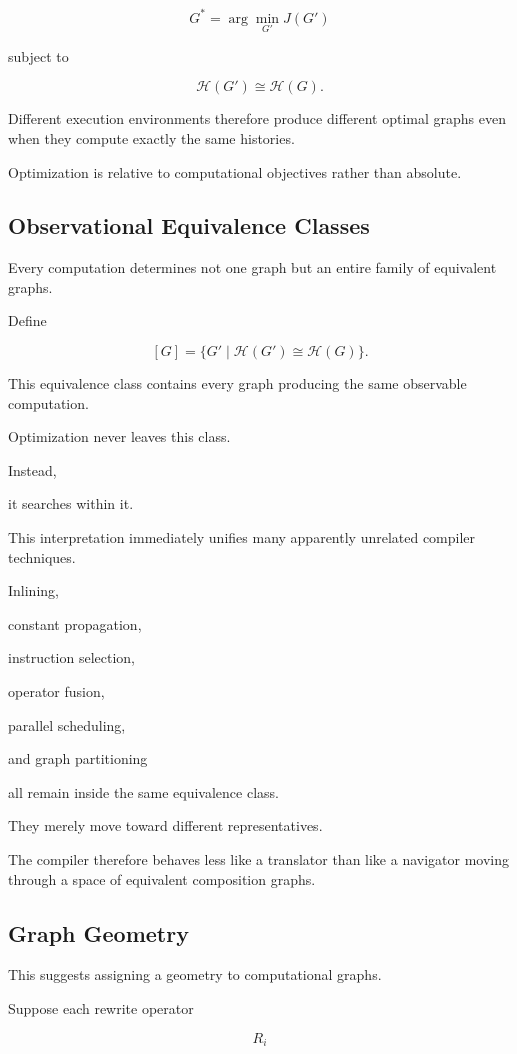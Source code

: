 \documentclass[12pt,oneside]{article}
\begin{document}
\[
G^*
=
\arg\min_{G'}
J(G')
\]

subject to

\[
\mathcal H(G')
\cong
\mathcal H(G).
\]

Different execution environments therefore produce different optimal graphs even when they compute exactly the same histories.

Optimization is relative to computational objectives rather than absolute.

\subsection{Observational Equivalence Classes}

Every computation determines not one graph but an entire family of equivalent graphs.

Define

\[
[G]
=
\{
G'
\mid
\mathcal H(G')
\cong
\mathcal H(G)
\}.
\]

This equivalence class contains every graph producing the same observable computation.

Optimization never leaves this class.

Instead,

it searches within it.

This interpretation immediately unifies many apparently unrelated compiler techniques.

Inlining,

constant propagation,

instruction selection,

operator fusion,

parallel scheduling,

and graph partitioning

all remain inside the same equivalence class.

They merely move toward different representatives.

The compiler therefore behaves less like a translator than like a navigator moving through a space of equivalent composition graphs.

\subsection{Graph Geometry}

This suggests assigning a geometry to computational graphs.

Suppose each rewrite operator

\[
R_i
\]
\end{document}
